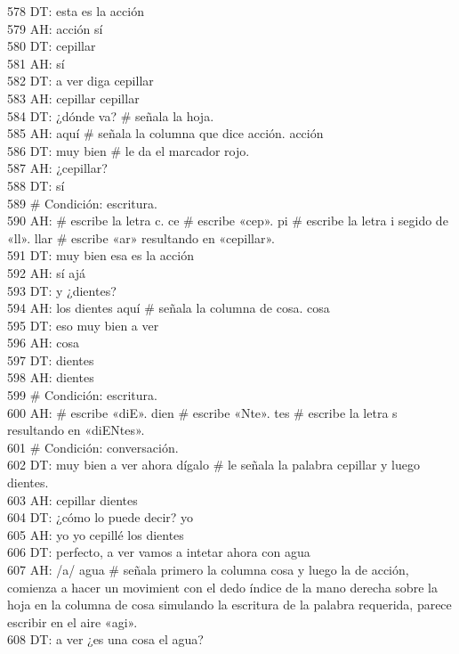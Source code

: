 578 DT: esta es la acción\\
579 AH: acción sí\\
580 DT: cepillar\\
581 AH: sí\\
582 DT: a ver diga cepillar\\
583 AH: cepillar cepillar\\
584 DT: ¿dónde va? # señala la hoja.\\
585 AH: aquí # señala la columna que dice acción. acción\\
586 DT: muy bien # le da el marcador rojo.\\
587 AH: ¿cepillar?\\
588 DT: sí\\
589 # Condición: escritura.\\
590 AH: # escribe la letra c. ce # escribe «cep». pi # escribe la letra i segido de «ll». llar # escribe «ar» resultando en «cepillar».\\
591 DT: muy bien esa es la acción\\
592 AH: sí ajá\\
593 DT: y ¿dientes?\\
594 AH: los dientes aquí # señala la columna de cosa. cosa\\
595 DT: eso muy bien a ver\\
596 AH: cosa\\
597 DT: dientes\\
598 AH: dientes\\
599 # Condición: escritura.\\
600 AH: # escribe «diE». dien # escribe «Nte». tes # escribe la letra s resultando en «diENtes».\\
601 # Condición: conversación.\\
602 DT: muy bien a ver ahora dígalo # le señala la palabra cepillar y luego dientes.\\
603 AH: cepillar dientes\\
604 DT: ¿cómo lo puede decir? yo\\
605 AH: yo yo cepillé los dientes\\
606 DT: perfecto, a ver vamos a intetar ahora con agua\\
607 AH: /a/ agua # señala primero la columna cosa y luego la de acción, comienza a hacer un movimient con el dedo índice de la mano derecha sobre la hoja en la columna de cosa simulando la escritura de la palabra requerida, parece escribir en el aire «agi».\\
608 DT: a ver ¿es una cosa el agua?\\
